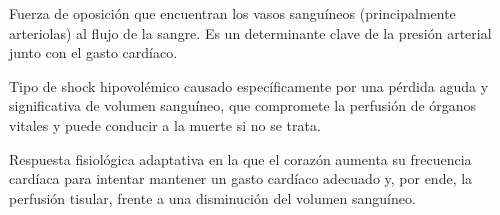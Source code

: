 \documentclass[12pt, letterpaper]{article}
\begin{document}
\begin{description}[style=unboxed, leftmargin=0cm]
    \item[\textbf{Resistencia Periférica Total (RPT):}] Fuerza de oposición que encuentran los vasos sanguíneos (principalmente arteriolas) al flujo de la sangre. Es un determinante clave de la presión arterial junto con el gasto cardíaco.
    
    \item[\textbf{Shock hemorrágico:}] Tipo de shock hipovolémico causado específicamente por una pérdida aguda y significativa de volumen sanguíneo, que compromete la perfusión de órganos vitales y puede conducir a la muerte si no se trata.
    
    \item[\textbf{Taquicardia compensatoria:}] Respuesta fisiológica adaptativa en la que el corazón aumenta su frecuencia cardíaca para intentar mantener un gasto cardíaco adecuado y, por ende, la perfusión tisular, frente a una disminución del volumen sanguíneo.
\end{description}
\newpage

\listoftables
{}
\newpage



\newpage


\newpage


\newpage


\newpage


\newpage


\newpage


\newpage


\end{document}
